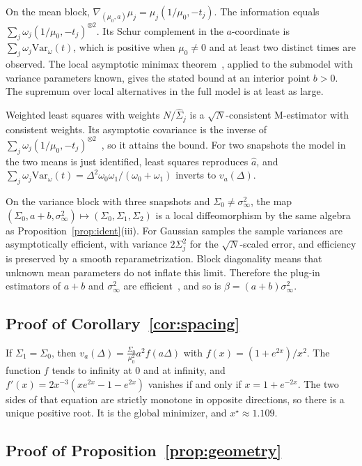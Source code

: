 \documentclass[anon,11pt]{alt2027}
\providecommand{\qed}{\hfill\BlackBox}
\newcommand{\Var}{\mathrm{Var}}
\begin{document}
On the mean block,
$\nabla_{(\mu_0,a)}\mu_j=\mu_j(1/\mu_0,-t_j)$.
The information equals $\sum_j\omega_j(1/\mu_0,-t_j)^{\otimes 2}$. Its Schur
complement in the $a$-coordinate is $\sum_j\omega_j\Var_\omega(t)$, which is
positive when $\mu_0\neq 0$ and at least two distinct times are observed.
The local asymptotic minimax theorem~\cite[Thm.~8.11]{vanderVaart98}, applied
to the submodel with variance parameters known, gives the stated bound at an
interior point $b>0$. The
supremum over local alternatives in the full model is at least as large.

Weighted least squares with weights $N/\hat\Sigma_j$ is a $\sqrt N$-consistent
M-estimator with consistent weights. Its asymptotic covariance is the inverse
of $\sum_j\omega_j(1/\mu_0,-t_j)^{\otimes 2}$~\cite[Ch.~5]{vanderVaart98}, so it
attains the bound. For two snapshots the model in the two means is just
identified, least squares reproduces $\hat a$, and
$\sum_j\omega_j\Var_\omega(t)=\Delta^2\omega_0\omega_1/(\omega_0+\omega_1)$
inverts to $v_a(\Delta)$.

On the variance block with three snapshots and $\Sigma_0\neq\sigma_\infty^2$,
the map $(\Sigma_0,a+b,\sigma_\infty^2)\mapsto(\Sigma_0,\Sigma_1,\Sigma_2)$ is a
local diffeomorphism by the same algebra as Proposition~\ref{prop:ident}(iii).
For Gaussian samples the sample variances are asymptotically efficient, with
variance $2\Sigma_j^2$ for the $\sqrt N$-scaled error, and efficiency is
preserved by a smooth reparametrization. Block diagonality means that unknown
mean parameters do not inflate this limit. Therefore the plug-in estimators of
$a+b$ and $\sigma_\infty^2$ are efficient~\cite[Thm.~8.8]{vanderVaart98}, and so
is $\beta=(a+b)\sigma_\infty^2$.\qed

\subsection{Proof of Corollary~\ref{cor:spacing}}

If $\Sigma_1=\Sigma_0$, then
$v_a(\Delta)=\frac{\Sigma_0}{\mu_0^2}a^2 f(a\Delta)$ with
$f(x)=(1+e^{2x})/x^2$. The function $f$ tends to infinity at $0$ and at
infinity, and
$f'(x)=2x^{-3}(xe^{2x}-1-e^{2x})$ vanishes if and only if $x=1+e^{-2x}$.
The two sides of that equation are strictly monotone in opposite directions, so
there is a unique positive root. It is the global minimizer, and
$x^\star\approx 1.109$.\qed

\subsection{Proof of Proposition~\ref{prop:geometry}}
\end{document}
